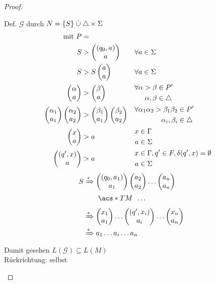 {\begin{proof}
\begin{itemize}
	Def. $\mathcal{G}$ durch $N = \{S\}\mathrel{\dot\cup}\triangle\times\Sigma$
	\begin{align*}
		\text{mit } P &= \\
		S &\-> \pmqty{(q_0,a)\\a} &&\forall a\in\Sigma\\
		S &\-> S\pmqty{a\\a} &&\forall a\in\Sigma\\
		\pmqty{\alpha\\a}
			&\-> \pmqty{\beta\\a}
			&&\begin{aligned}
				\forall \alpha\->\beta &\in P'\\
				\alpha,\beta &\in\triangle
			\end{aligned}\\
		\pmqty{\alpha_1\\a_1}\pmqty{\alpha_2\\a_2}
			&\-> \pmqty{\beta_1\\a_1}\pmqty{\beta_2\\a_2}
			&&\begin{aligned}
				\forall \alpha_1\alpha_2\->\beta_1\beta_2 &\in P'\\
				\alpha_i,\beta_i &\in\triangle
			\end{aligned}\\
		\pmqty{x\\a} &\-> a
			&&\begin{aligned}
				x&\in\Gamma\\
				a&\in\Sigma
			\end{aligned}\\
		\pmqty{(q',x)\\a} &\-> a
			&&\begin{aligned}
				x&\in\Gamma, q'\in F, \delta (q',x)=\emptyset\\
				a&\in\Sigma
			\end{aligned}
	\end{align*}
	\begin{align*}
		S &\xRightarrow{*} \pmqty{(q_0,a_1)\\a_1}\pmqty{a_2\\a_2}\dots\pmqty{a_n\\a_n}\\
		&\phantom{{}\xRightarrow{*}{}}\ \acs*{TM}\ \,\dots\\
		&\xRightarrow{*} \pmqty{x_1\\a_1}\dots\pmqty{(q',x_i)\\a_i}\dots\pmqty{x_n\\a_n}\\
		&\xRightarrow{*} a_1\dots a_i\dots a_n
	\end{align*}
	Damit gesehen $L(\mathcal{G})\subseteq L(M)$\\
	Rückrichtung: selbst \qedhere
	\end{itemize}
\end{proof}

}
